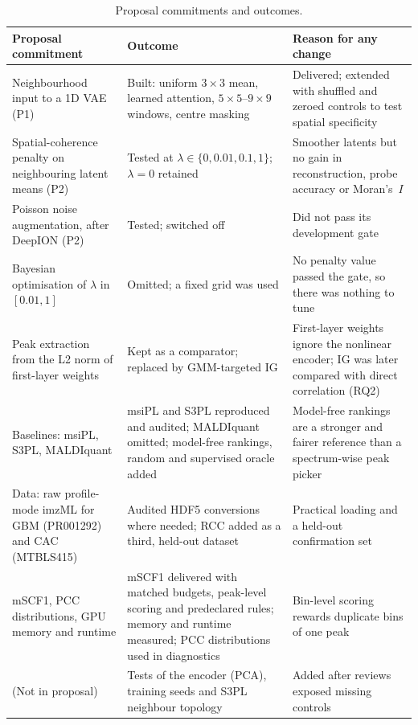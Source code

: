 \begin{table}[t]
\caption{Proposal commitments and outcomes.}
\label{tab:proposal}
\centering\small
\begin{tabularx}{\textwidth}{@{}p{3.6cm}X X@{}}
\toprule
Proposal commitment & Outcome & Reason for any change \\
\midrule
Neighbourhood input to a 1D VAE (P1) & Built: uniform $3\times3$ mean, learned attention, $5\times5$--$9\times9$ windows, centre masking & Delivered; extended with shuffled and zeroed controls to test spatial specificity \\
Spatial-coherence penalty on neighbouring latent means (P2) & Tested at $\lambda\in\{0,0.01,0.1,1\}$; $\lambda=0$ retained & Smoother latents but no gain in reconstruction, probe accuracy or Moran's~$I$ \\
Poisson noise augmentation, after DeepION (P2) & Tested; switched off & Did not pass its development gate \\
Bayesian optimisation of $\lambda$ in $[0.01, 1]$ & Omitted; a fixed grid was used & No penalty value passed the gate, so there was nothing to tune \\
Peak extraction from the L2 norm of first-layer weights & Kept as a comparator; replaced by GMM-targeted IG & First-layer weights ignore the nonlinear encoder; IG was later compared with direct correlation (RQ2) \\
Baselines: msiPL, S3PL, MALDIquant & msiPL and S3PL reproduced and audited; MALDIquant omitted; model-free rankings, random and supervised oracle added & Model-free rankings are a stronger and fairer reference than a spectrum-wise peak picker \\
Data: raw profile-mode imzML for GBM (PR001292) and CAC (MTBLS415) & Audited HDF5 conversions where needed; RCC added as a third, held-out dataset & Practical loading and a held-out confirmation set \\
mSCF1, PCC distributions, GPU memory and runtime & mSCF1 delivered with matched budgets, peak-level scoring and predeclared rules; memory and runtime measured; PCC distributions used in diagnostics & Bin-level scoring rewards duplicate bins of one peak \\
(Not in proposal) & Tests of the encoder (PCA), training seeds and S3PL neighbour topology & Added after reviews exposed missing controls \\
\bottomrule
\end{tabularx}
\end{table}
